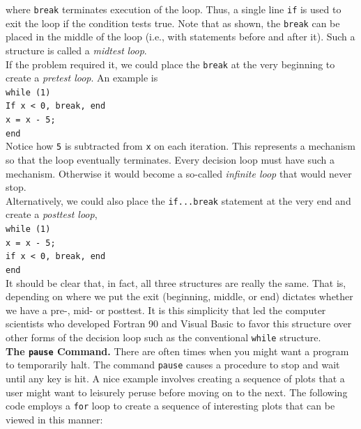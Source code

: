 \documentclass[../main.tex]{subfiles}
\begin{document}
\noindent where \texttt{break} terminates execution of the loop. Thus, a single line \texttt{if} is used to exit the
loop if the condition tests true. Note that as shown, the \texttt{break} can be placed in the middle
of the loop (i.e., with statements before and after it). Such a structure is called a \emph{midtest}
\emph{loop}.\\
\indent If the problem required it, we could place the \texttt{break} at the very beginning to create a
\emph{pretest loop}. An example is\\

\texttt{while (1)\\
\indent\hspace{2mm} If x < 0, break, end\\
\indent\hspace{2mm} x = x - 5;\\
\indent end}\\

\noindent Notice how \texttt{5} is subtracted from \texttt{x} on each iteration. This represents a mechanism so that
the loop eventually terminates. Every decision loop must have such a mechanism. Otherwise
it would become a so-called \emph{infinite loop} that would never stop.\\
\indent Alternatively, we could also place the \texttt{if...break} statement at the very end and create
a \emph{posttest loop},\\

\texttt{while (1)\\
\indent\hspace{2mm} x = x - 5;\\
\indent\hspace{2mm} if x < 0, break, end\\
\indent end}\\

It should be clear that, in fact, all three structures are really the same. That is, depending
on where we put the exit (beginning, middle, or end) dictates whether we have a pre-,
mid- or posttest. It is this simplicity that led the computer scientists who developed
Fortran 90 and Visual Basic to favor this structure over other forms of the decision loop
such as the conventional \texttt{while} structure.\\

\noindent\textbf{The \texttt{pause} Command.} There are often times when you might want a program to temporarily
halt. The command \texttt{pause} causes a procedure to stop and wait until any key is hit.
A nice example involves creating a sequence of plots that a user might want to leisurely
peruse before moving on to the next. The following code employs a \texttt{for} loop to create a
sequence of interesting plots that can be viewed in this manner:\\
\end{document}
